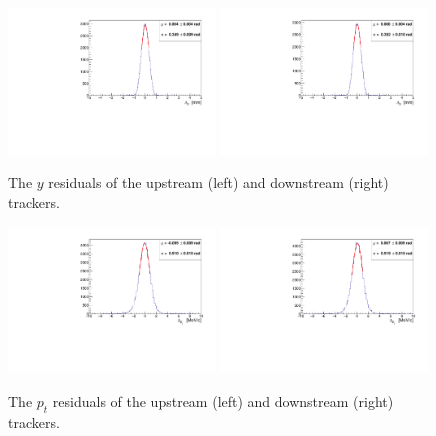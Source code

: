     \begin{figure}[p]
    \begin{center}
      \includegraphics[width=0.49\textwidth, angle=0]{08-Performance/upstream_y_residual.pdf}
      \includegraphics[width=0.49\textwidth, angle=0]{08-Performance/downstream_y_residual.pdf}
      \caption{\label{fig:YResidKalman} The $y$ residuals of the upstream (left) and downstream (right) trackers.}
    \end{center}
  \end{figure} 
  
  \begin{figure}[p]
    \begin{center}
      \includegraphics[width=0.49\textwidth, angle=0]{08-Performance/upstream_pt_residual.pdf}
      \includegraphics[width=0.49\textwidth, angle=0]{08-Performance/downstream_pt_residual.pdf}
      \caption{\label{fig:PtResidKalman} The $p_{t}$ residuals of the upstream (left) and downstream (right) trackers.}
    \end{center}
  \end{figure}
  
